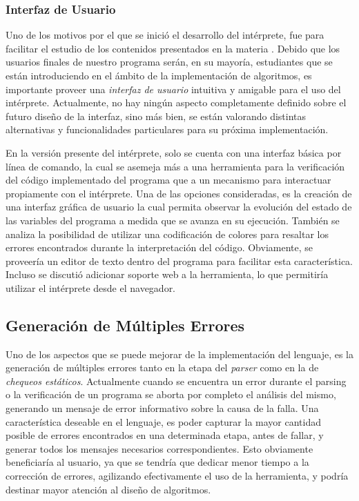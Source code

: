 \subsubsection{Interfaz de Usuario}

Uno de los motivos por el que se inició el desarrollo del intérprete, fue para facilitar el estudio de los contenidos presentados en la materia \Materia{}.
Debido que los usuarios finales de nuestro programa serán, en su mayoría, estudiantes que se están introduciendo en el ámbito de la implementación de algoritmos, es importante proveer una \textit{interfaz de usuario} intuitiva y amigable para el uso del intérprete.
Actualmente, no hay ningún aspecto completamente definido sobre el futuro diseño de la interfaz, sino más bien, se están valorando distintas alternativas y funcionalidades particulares para su próxima implementación.

En la versión presente del intérprete, solo se cuenta con una interfaz básica por línea de comando, la cual se asemeja más a una herramienta para la verificación del código implementado del programa que a un mecanismo para interactuar propiamente con el intérprete.
Una de las opciones consideradas, es la creación de una interfaz gráfica de usuario la cual permita observar la evolución del estado de las variables del programa a medida que se avanza en su ejecución.
También se analiza la posibilidad de utilizar una codificación de colores para resaltar los errores encontrados durante la interpretación del código.
Obviamente, se proveería un editor de texto dentro del programa para facilitar esta característica.
Incluso se discutió adicionar soporte web a la herramienta, lo que permitiría utilizar el intérprete desde el navegador.
\fi

\subsection{Generación de Múltiples Errores}

Uno de los aspectos que se puede mejorar de la implementación del lenguaje, es la generación de múltiples errores tanto en la etapa del \textit{parser} como en la de \textit{chequeos estáticos}.
Actualmente cuando se encuentra un error durante el parsing o la verificación de un programa se aborta por completo el análisis del mismo, generando un mensaje de error informativo sobre la causa de la falla.
Una característica deseable en el lenguaje, es poder capturar la mayor cantidad posible de errores encontrados en una determinada etapa, antes de fallar, y generar todos los mensajes necesarios correspondientes.
Esto obviamente beneficiaría al usuario, ya que se tendría que dedicar menor tiempo a la corrección de errores, agilizando efectivamente el uso de la herramienta, y podría destinar mayor atención al diseño de algoritmos.

